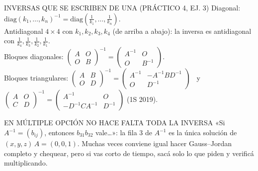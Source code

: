 \begin{memo}{INVERSAS QUE SE ESCRIBEN DE UNA (PRÁCTICO 4, EJ. 3)}
Diagonal: $\mathrm{diag}(k_1,\dots,k_n)^{-1}=\mathrm{diag}(\frac1{k_1},\dots,\frac1{k_n})$.\\
Antidiagonal $4\times4$ con $k_1,k_2,k_3,k_4$ (de arriba a abajo): la inversa es antidiagonal con $\frac1{k_4},\frac1{k_3},\frac1{k_2},\frac1{k_1}$.\\
Bloques diagonales: $\begin{pmatrix}A&O\\O&B\end{pmatrix}^{-1}=\begin{pmatrix}A^{-1}&O\\O&B^{-1}\end{pmatrix}$.\\
Bloques triangulares: $\begin{pmatrix}A&B\\O&D\end{pmatrix}^{-1}=\begin{pmatrix}A^{-1}&-A^{-1}BD^{-1}\\O&D^{-1}\end{pmatrix}$ \ y \ $\begin{pmatrix}A&O\\C&D\end{pmatrix}^{-1}=\begin{pmatrix}A^{-1}&O\\-D^{-1}CA^{-1}&D^{-1}\end{pmatrix}$ (1S 2019).
\end{memo}
\begin{trampa}{EN MÚLTIPLE OPCIÓN NO HACE FALTA TODA LA INVERSA}
«Si $A^{-1}=(b_{ij})$, entonces $b_{31}b_{32}$ vale\dots»: la fila 3 de $A^{-1}$ es la única solución de $(x,y,z)\,A=(0,0,1)$. Muchas veces conviene igual hacer Gauss--Jordan completo y chequear, pero si vas corto de tiempo, sacá solo lo que piden y verificá multiplicando.
\end{trampa}

